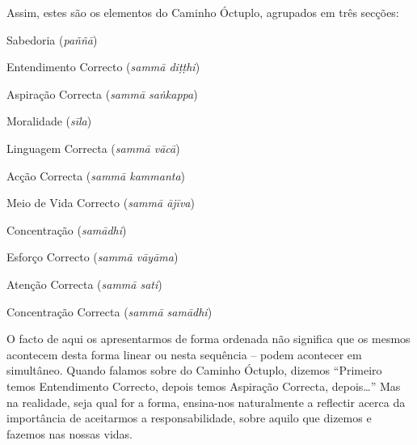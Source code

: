 Assim, estes são os elementos do Caminho Óctuplo, agrupados em três secções:

\clearpage

\bigskip

Sabedoria (\emph{paññā})

\bigskip

\begin{packedenumerate}

\item Entendimento Correcto (\emph{sammā diṭṭhi})
\item Aspiração Correcta (\emph{sammā saṅkappa})

\end{packedenumerate}

\bigskip

Moralidade (\emph{sīla})

\bigskip

\begin{packedenumerate}
\setcounter{enumi}{2}

\item Linguagem Correcta (\emph{sammā vācā})
\item Acção Correcta (\emph{sammā kammanta})
\item Meio de Vida Correcto (\emph{sammā ājīva})

\end{packedenumerate}

\bigskip

Concentração (\emph{samādhi})

\bigskip

\begin{packedenumerate}
\setcounter{enumi}{5}

\item Esforço Correcto (\emph{sammā vāyāma})
\item Atenção Correcta (\emph{sammā sati})
\item Concentração Correcta (\emph{sammā samādhi})

\end{packedenumerate}

\bigskip

O facto de aqui os apresentarmos de forma ordenada não significa que os mesmos
acontecem desta forma linear ou nesta sequência – podem acontecer em simultâneo.
Quando falamos sobre do Caminho Óctuplo, dizemos “Primeiro temos Entendimento
Correcto, depois temos Aspiração Correcta, depois\ldots{}” Mas na realidade, seja
qual for a forma, ensina-nos naturalmente a reflectir acerca da importância de
aceitarmos a responsabilidade, sobre aquilo que dizemos e fazemos nas nossas
vidas.

